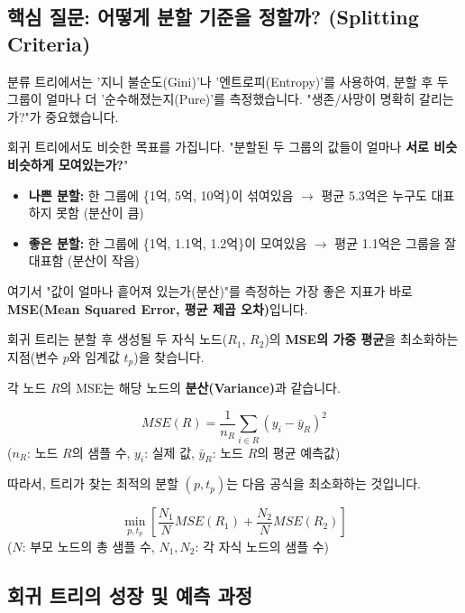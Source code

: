 \documentclass[11pt,a4paper]{book}
\theoremstyle{definition}
\begin{document}
\subsection{핵심 질문: 어떻게 분할 기준을 정할까? (Splitting Criteria)}

분류 트리에서는 '지니 불순도(Gini)'나 '엔트로피(Entropy)'를 사용하여, 분할 후 두 그룹이 얼마나 더 '순수해졌는지(Pure)'를 측정했습니다. "생존/사망이 명확히 갈리는가?"가 중요했습니다.

회귀 트리에서도 비슷한 목표를 가집니다.
"분할된 두 그룹의 값들이 얼마나 \textbf{서로 비슷비슷하게 모여있는가?}"

\begin{itemize}
    \item \textbf{나쁜 분할:} 한 그룹에 \{1억, 5억, 10억\}이 섞여있음 $\rightarrow$ 평균 5.3억은 누구도 대표하지 못함 (분산이 큼)
    \item \textbf{좋은 분할:} 한 그룹에 \{1억, 1.1억, 1.2억\}이 모여있음 $\rightarrow$ 평균 1.1억은 그룹을 잘 대표함 (분산이 작음)
\end{itemize}

여기서 "값이 얼마나 흩어져 있는가(분산)"를 측정하는 가장 좋은 지표가 바로 \textbf{MSE(Mean Squared Error, 평균 제곱 오차)}입니다.

\begin{boxDefinition}[title={회귀 트리의 분할 기준: MSE 최소화}]
    회귀 트리는 분할 후 생성될 두 자식 노드($R_1$, $R_2$)의 \textbf{MSE의 가중 평균}을 최소화하는 지점(변수 $p$와 임계값 $t_p$)을 찾습니다.

    각 노드 $R$의 MSE는 해당 노드의 \textbf{분산(Variance)}과 같습니다.
    
    $$ MSE(R) = \frac{1}{n_R} \sum_{i \in R} (y_i - \bar{y}_R)^2 $$
    ($n_R$: 노드 $R$의 샘플 수, $y_i$: 실제 값, $\bar{y}_R$: 노드 $R$의 평균 예측값)

    \vspace{1em}
    따라서, 트리가 찾는 최적의 분할 $(p, t_p)$는 다음 공식을 최소화하는 것입니다.

    $$ \min_{p, t_p} \left[ \frac{N_1}{N} MSE(R_1) + \frac{N_2}{N} MSE(R_2) \right] $$
    ($N$: 부모 노드의 총 샘플 수, $N_1, N_2$: 각 자식 노드의 샘플 수)
\end{boxDefinition}

\subsection{회귀 트리의 성장 및 예측 과정}
\end{document}
